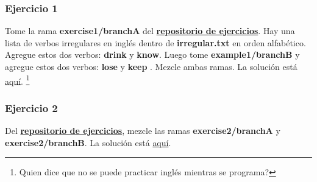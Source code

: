 \subsubsection{Ejercicio 1}
Tome la rama {\bf exercise1/branchA } del \hyperref[exercises_repo]{\bf repositorio de ejercicios}. Hay una lista
de verbos irregulares en inglés dentro de {\bf irregular.txt} en orden alfabético. Agregue estos dos verbos: {\bf drink} y {\bf know}.
Luego tome {\bf example1/branchB } y agregue estos dos verbos: {\bf lose } y {\bf keep }. Mezcle ambas ramas. La solución está
\hyperref[exercise_01]{aquí}. \footnote{ Quien dice que no se puede practicar inglés mientras se programa? }

\subsubsection{Ejercicio 2}
Del \hyperref[exercises_repo]{\bf repositorio de ejercicios}, mezcle las ramas {\bf exercise2/branchA} y {\bf exercise2/branchB}.
La solución está \hyperref[exercise_02]{aquí}.
